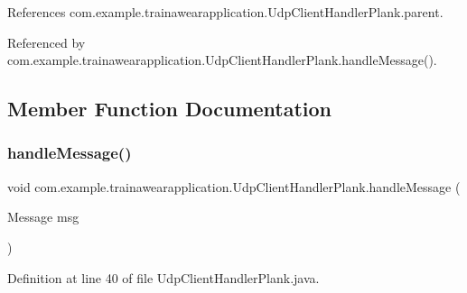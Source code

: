 References com.\+example.\+trainawearapplication.\+Udp\+Client\+Handler\+Plank.\+parent.



Referenced by com.\+example.\+trainawearapplication.\+Udp\+Client\+Handler\+Plank.\+handle\+Message().



\subsection{Member Function Documentation}
\mbox{\label{classcom_1_1example_1_1trainawearapplication_1_1_udp_client_handler_plank_a2182425709c67eae734dd1f8dc2e228c}} 
\subsubsection{\texorpdfstring{handleMessage()}{handleMessage()}}
{\footnotesize\ttfamily void com.\+example.\+trainawearapplication.\+Udp\+Client\+Handler\+Plank.\+handle\+Message (\begin{DoxyParamCaption}\item[{Message}]{msg }\end{DoxyParamCaption})}



Definition at line 40 of file Udp\+Client\+Handler\+Plank.\+java.


